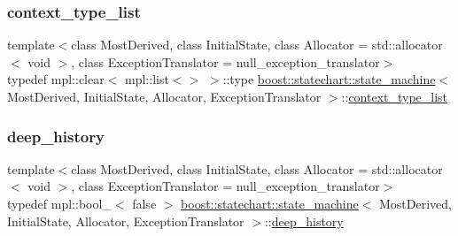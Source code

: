 \mbox{\label{classboost_1_1statechart_1_1state__machine_a40f2c6990aa142c91dd400bc677ccb15}} 
\subsubsection{\texorpdfstring{context\+\_\+type\+\_\+list}{context\_type\_list}}
{\footnotesize\ttfamily template$<$class Most\+Derived, class Initial\+State, class Allocator = std\+::allocator$<$ void $>$, class Exception\+Translator = null\+\_\+exception\+\_\+translator$>$ \\
typedef mpl\+::clear$<$ mpl\+::list$<$$>$ $>$\+::type \mbox{\hyperlink{classboost_1_1statechart_1_1state__machine}{boost\+::statechart\+::state\+\_\+machine}}$<$ Most\+Derived, Initial\+State, Allocator, Exception\+Translator $>$\+::\mbox{\hyperlink{classboost_1_1statechart_1_1state__machine_a40f2c6990aa142c91dd400bc677ccb15}{context\+\_\+type\+\_\+list}}}

\mbox{\label{classboost_1_1statechart_1_1state__machine_abd323e1963ca64cc774ed0ab2cff9dfd}} 
\subsubsection{\texorpdfstring{deep\+\_\+history}{deep\_history}}
{\footnotesize\ttfamily template$<$class Most\+Derived, class Initial\+State, class Allocator = std\+::allocator$<$ void $>$, class Exception\+Translator = null\+\_\+exception\+\_\+translator$>$ \\
typedef mpl\+::bool\+\_\+$<$ false $>$ \mbox{\hyperlink{classboost_1_1statechart_1_1state__machine}{boost\+::statechart\+::state\+\_\+machine}}$<$ Most\+Derived, Initial\+State, Allocator, Exception\+Translator $>$\+::\mbox{\hyperlink{classboost_1_1statechart_1_1state__machine_abd323e1963ca64cc774ed0ab2cff9dfd}{deep\+\_\+history}}}

